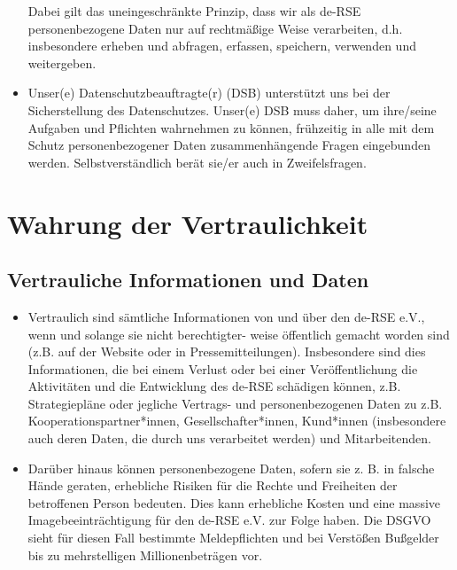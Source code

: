 \documentclass[a4paper, fontsize=11pt]{scrartcl}
\begin{document}
\begin{itemize}
\begin{itemize}
  \end{itemize}
  Dabei gilt das uneingeschränkte Prinzip, dass wir als de-RSE personenbezogene Daten nur auf rechtmäßige Weise verarbeiten, d.h. insbesondere erheben und abfragen, erfassen, speichern, verwenden und weitergeben.
  \item Unser(e) Datenschutzbeauftragte(r) (DSB) unterstützt uns bei der Sicherstellung des Datenschutzes. Unser(e) DSB muss daher, um ihre/seine Aufgaben und Pflichten wahrnehmen zu können, frühzeitig in alle mit dem Schutz personenbezogener Daten zusammenhängende Fragen eingebunden werden. Selbstverständlich berät sie/er auch in Zweifelsfragen.
\end{itemize}

\section{Wahrung der Vertraulichkeit}
\subsection{Vertrauliche Informationen und Daten}
\begin{itemize}
  \item Vertraulich sind sämtliche Informationen von und über den de-RSE e.V., wenn und solange sie nicht berechtigter- weise öffentlich gemacht worden sind (z.B. auf der Website oder in Pressemitteilungen). Insbesondere sind dies Informationen, die bei einem Verlust oder bei einer Veröffentlichung die Aktivitäten und die Entwicklung des de-RSE schädigen können, z.B. Strategiepläne oder jegliche Vertrags- und personenbezogenen Daten zu z.B. Kooperationspartner*innen, Gesellschafter*innen, Kund*innen (insbesondere auch deren Daten, die durch uns verarbeitet werden) und Mitarbeitenden.
  \item Darüber hinaus können personenbezogene Daten, sofern sie z. B. in falsche Hände geraten, erhebliche Risiken für die Rechte und Freiheiten der betroffenen Person bedeuten. Dies kann erhebliche Kosten und eine massive Imagebeeinträchtigung für den de-RSE e.V. zur Folge haben. Die DSGVO sieht für diesen Fall bestimmte Meldepflichten und bei Verstößen Bußgelder bis zu mehrstelligen Millionenbeträgen vor.
\end{itemize}
\end{document}
